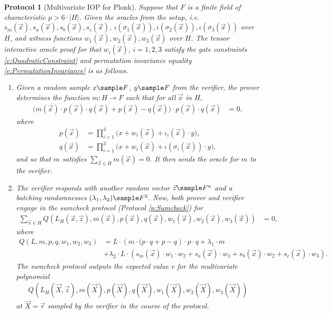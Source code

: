 \documentclass[11pt]{article}
\newtheorem{protocol}[]{Protocol}
\theoremstyle{definition}
\theoremstyle{remark}
\begin{document}
\begin{protocol}[Multivariate IOP for Plonk]
\label{p:Plonk}
Suppose that $F$ is a finite field of characteristic $p > 6\cdot |H|$.
Given the oracles from the setup, i.e. $s_m(\vec x), s_a(\vec x), s_b(\vec x), s_c(\vec x)$, $\iota(\sigma_{1}(\vec x)),\iota(\sigma_{2}(\vec x)), \iota(\sigma_{3}(\vec x))$  over $H$,  and witness functions $w_1(\vec x), w_2(\vec x), w_3(\vec x)$ over $H$.
The tensor interactive oracle proof for that $w_i(\vec x)$, $i=1,2,3$ satisfy the gate constraints \eqref{e:QuadraticConstraint} and permutation invariance equality \eqref{e:PermutationInvariance} is as follows.
\begin{enumerate} 
\item
\label{i:PAstep1}
Given a random sample $x \sample F$, $y\sample F$ from the verifier, the prover determines the function $m: H\rightarrow F$ such that for all $\vec x$ in $H$,
\begin{align} 
\label{e:m}
\Big(
m(\vec x)\cdot p(\vec x) \cdot q(\vec x)  + p(\vec x) - q(\vec x)\Big)
\cdot  p(\vec x)\cdot q(\vec x) &= 0,
\end{align}
where 
\begin{align}
p(\vec x) &= \prod_{i=1}^3 \big( x + w_i(\vec x) + \iota_i(\vec x)\cdot y \big),
\\
q(\vec x) &= \prod_{i=1}^3 \big( x + w_i(\vec x) + \iota\left(\sigma_i (\vec x)\right)\cdot  y\big),
\end{align}
and so that $m$ satisfies $\sum_{\vec x\in H} m(\vec x) = 0$.
It then sends the oracle for $m$ to the verifier.

\item
\label{i:PAstep2}
The verifier responds with another random vector $\vec z \sample F^n$ and a batching randomnesses $(\lambda_1,\lambda_2)\sample F^2$.
Now, both prover and verifier engage in the sumcheck protocol (Protocol \ref{p:Sumcheck}) for 
\begin{align} 
\label{e:PlonkSumcheckm}
	\sum_{\vec x \in H} Q(L_H(\vec x, \vec z), m(\vec x),  p(\vec x), q(\vec x), w_1(\vec x), w_2(\vec x), w_3(\vec x))&= 0,
\end{align}
where 
\begin{equation}
\begin{aligned}
Q(L , m, p, q, w_1, w_2, w_3) &=   
L \cdot  \left(m\cdot ( p \cdot q + p - q\right)\cdot  p \cdot q +  \lambda_1 \cdot m
\\
&+ \lambda_2 \cdot L \cdot \left( s_m(\vec x)\cdot w_1\cdot w_2 + s_a(\vec x)\cdot w_1 + s_b(\vec x)\cdot w_2 + s_c(\vec x)\cdot w_3\right).
\end{aligned}
\end{equation}
The sumcheck protocol outputs the expected value $v$ for the multivariate polynomial 
\begin{equation}
\label{e:QPlonk}
\begin{aligned}
Q(L_H(\vec X, \vec z), m(\vec X),  p(\vec X), q(\vec X), w_1(\vec X), w_2(\vec X), w_3(\vec X))
\end{aligned}
\end{equation}
at $\vec X=\vec r$ sampled by the verifier in the course of the protocol.


\end{enumerate}
\end{protocol}
\end{document}
